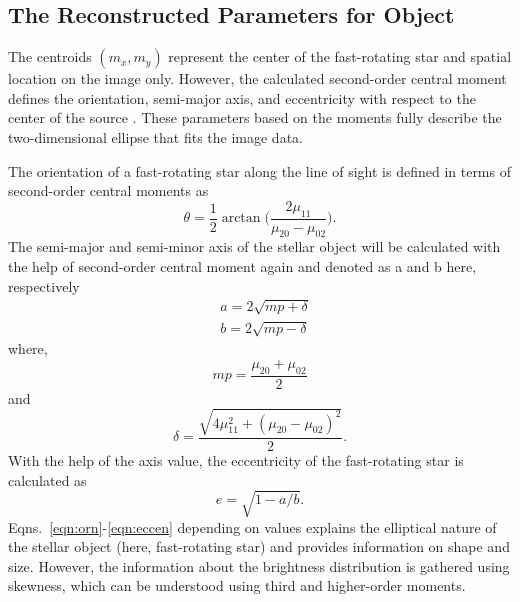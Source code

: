 \subsection{The Reconstructed Parameters for Object}
The centroids $(m_x, m_y)$ represent the center of the fast-rotating star and spatial location on the image only. However, the calculated second-order central moment defines the orientation, semi-major axis, and eccentricity with respect to the center of the source \citep{teague1980image}. These parameters based on the moments fully describe the two-dimensional ellipse that fits the image data. 

The orientation of a fast-rotating star along the line of sight is defined in terms of second-order central moments as
\begin{equation}
	\theta = \frac{1}{2}\arctan \big(\frac{2\mu_{11}}{\mu_{20} - \mu_{02}}\big).
	\label{eqn:orn}
\end{equation}
The semi-major and semi-minor axis of the stellar object will be calculated with the help of second-order central moment again and denoted as a and b here, respectively
\begin{equation}
	\begin{aligned}
		&a = 2\sqrt{mp + \delta} \\
		&b = 2\sqrt{mp - \delta}
	\end{aligned}
	\label{eqn:semi}
\end{equation}
where,
\begin{equation}
	mp = \frac{\mu_{20} + \mu_{02}}{2}
	\label{eqn:mp}
\end{equation}
and
\begin{equation}
	\delta = \frac{\sqrt{4\mu_{11}^2 + (\mu_{20} - \mu_{02})^2}}{2}.	
	\label{eqn:delta}
\end{equation}
With the help of the axis value, the eccentricity of the fast-rotating star is calculated as
\begin{equation}
	e = \sqrt{1 - a/b}.
	\label{eqn:eccen}
\end{equation}
Eqns.~\ref{eqn:orn}-\ref{eqn:eccen} depending on values explains the elliptical nature of the stellar object (here, fast-rotating star) and provides information on shape and size. However, the information about the brightness distribution is gathered using skewness, which can be understood using third and higher-order moments.